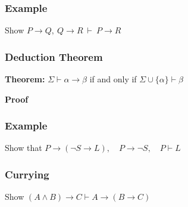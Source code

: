\documentclass{beamer}
\theoremstyle{indentDefn} \newtheorem{defn}[]{Definition}
\begin{document}
\begin{frame}
	\frametitle{Example}
	
	Show $P \rightarrow Q, \ Q \rightarrow R \ \vdash \ P \rightarrow R$
	
	\vspace{7cm}
	
\end{frame}

\begin{frame}
	\frametitle{Deduction Theorem}	
	
	{\bf Theorem:} $\Sigma \vdash \alpha \rightarrow \beta$ if and only if $\Sigma \cup \{\alpha\} \vdash \beta$
	
	\vspace{0.5cm}
	
	{\bf Proof} 
	
	\vspace{5cm}
	
	
	
\end{frame}

\begin{frame}
	\frametitle{Example}
	
	Show that $P \rightarrow (\lnot S\rightarrow L), \hspace{1em} P\rightarrow \lnot S, \hspace{1em} P \vdash L$

	\vspace{7cm}
	
\end{frame}

\begin{frame}
  \frametitle{Currying}

  Show $(A \land B) \to C \vdash A \to (B \to C)$
  
  \vspace{6cm}

\end{frame}
\end{document}
